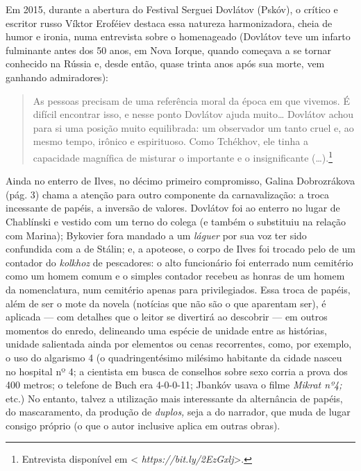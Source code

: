 Em 2015, durante a abertura do Festival Serguei Dovlátov (Pskóv), o
crítico e escritor russo Víktor Eroféiev destaca essa natureza
harmonizadora, cheia de humor e ironia, numa entrevista sobre o
homenageado (Dovlátov teve um infarto fulminante antes dos 50 anos, em
Nova Iorque, quando começava a se tornar conhecido na Rússia e, desde
então, quase trinta anos após sua morte, vem ganhando admiradores):

\begin{quote}
As pessoas precisam de uma referência moral da época em que vivemos. É
difícil encontrar isso, e nesse ponto Dovlátov ajuda muito\ldots{} Dovlátov
achou para si uma posição muito equilibrada: um observador um tanto
cruel e, ao mesmo tempo, irônico e espirituoso. Como Tchékhov, ele tinha
a capacidade magnífica de misturar o importante e o insignificante
(\ldots{}).\footnote{Entrevista disponível em \textless{}
  \emph{https://bit.ly/2EzGxlj}\textgreater{}.}
\end{quote}

\begin{center}
{}
\end{center}

Ainda no enterro de Ilves, no décimo primeiro compromisso, Galina
Dobrozrákova (pág. 3) chama a atenção para outro componente da
carnavalização: a troca incessante de papéis, a inversão de valores.
Dovlátov foi ao enterro no lugar de Chablínski e vestido com um terno do
colega (e também o substituiu na relação com Marina); Bykovier fora
mandado a um \emph{láguer} por sua voz ter sido confundida com a de
Stálin; e, a apoteose, o corpo de Ilves foi trocado pelo de um contador
do \emph{kolkhoz} de pescadores: o alto funcionário foi enterrado num
cemitério como um homem comum e o simples contador recebeu as honras de
um homem da nomenclatura, num cemitério apenas para privilegiados. Essa
troca de papéis, além de ser o mote da novela (notícias que não são o
que aparentam ser), é aplicada --- com detalhes que o leitor se
divertirá ao descobrir --- em outros momentos do enredo, delineando uma
espécie de unidade entre as histórias, unidade salientada ainda por
elementos ou cenas recorrentes, como, por exemplo, o uso do algarismo 4
(o quadringentésimo milésimo habitante da cidade nasceu no hospital nº
4; a cientista em busca de conselhos sobre sexo corria a prova dos 400
metros; o telefone de Buch era 4-0-0-11; Jbankóv usava o filme
\emph{Mikrat nº4;} etc.) No entanto, talvez a utilização mais
interessante da alternância de papéis, do mascaramento, da produção de
\emph{duplos,} seja a do narrador, que muda de lugar consigo próprio (o
que o autor inclusive aplica em outras obras).

